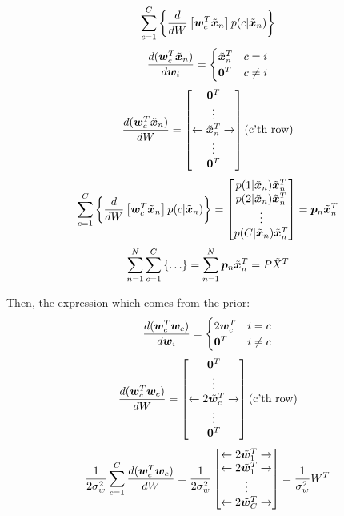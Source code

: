 \documentclass[../../main.tex]{subfiles}
\begin{document}
\[
\sum_{c=1}^C \left\{
    \frac{d}{dW}\left[\bm{w}_c^T\tilde{\bm{x}}_n \right]
    p(c|\tilde{\bm{x}}_n)
\right\}
\]
\[
\frac{d(\bm{w}_c^T\tilde{\bm{x}}_n)}{d\bm{w}_i} =
\begin{cases}
    \tilde{\bm{x}}_n^T & c = i \\
    \bm{0}^T & c \neq i
\end{cases}
\]
\[
\frac{d(\bm{w}_c^T\tilde{\bm{x}}_n)}{dW} =
\left[\begin{matrix}
    \bm{0}^T \\
    \vdots \\
    \leftarrow \tilde{\bm{x}}_n^T \rightarrow \\
    \vdots \\
    \bm{0}^T
\end{matrix}\right]
\begin{matrix} \\ \textrm{(c'th row)} \\ \\ \end{matrix}
\]
\[
\sum_{c=1}^C \left\{
    \frac{d}{dW}\left[\bm{w}_c^T\tilde{\bm{x}}_n \right]
    p(c|\tilde{\bm{x}}_n)
\right\} =
\left[\begin{matrix}
    p(1|\tilde{\bm{x}}_n)\tilde{\bm{x}}_n^T \\
    p(2|\tilde{\bm{x}}_n)\tilde{\bm{x}}_n^T \\
    \vdots \\
    p(C|\tilde{\bm{x}}_n)\tilde{\bm{x}}_n^T
\end{matrix}\right] =
\bm{p}_n\tilde{\bm{x}}_n^T
\]
\[
\sum_{n=1}^N \sum_{c=1}^C \left\{ \ldots \right\} =
\sum_{n=1}^N \bm{p}_n\tilde{\bm{x}}_n^T = P\tilde{X}^T
\]

Then, the expression which comes from the prior:
\[ \frac{d(\bm{w}_c^T\bm{w}_c)}{d\bm{w}_i} =
\begin{cases}
    2\bm{w}_c^T & i = c \\
    \bm{0}^T & i \neq c
\end{cases}
\]
\[ \frac{d(\bm{w}_c^T\bm{w}_c)}{dW} =
\left[\begin{matrix}
    \bm{0}^T \\
    \vdots \\
    \leftarrow 2\tilde{\bm{w}}_c^T \rightarrow \\
    \vdots \\
    \bm{0}^T
\end{matrix}\right]
\begin{matrix} \\ \textrm{(c'th row)} \\ \\ \end{matrix}
\]
\[ \frac{1}{2\sigma_w^2}\sum_{c=1}^C \frac{d(\bm{w}_c^T\bm{w}_c)}{dW} = \frac{1}{2\sigma_w^2}
\left[\begin{matrix}
    \leftarrow 2\tilde{\bm{w}}_1^T \rightarrow \\
    \leftarrow 2\tilde{\bm{w}}_1^T \rightarrow \\
    \vdots \\
    \leftarrow 2\tilde{\bm{w}}_C^T \rightarrow
\end{matrix}\right] =
\frac{1}{\sigma_w^2}W^T
\]
\end{document}
